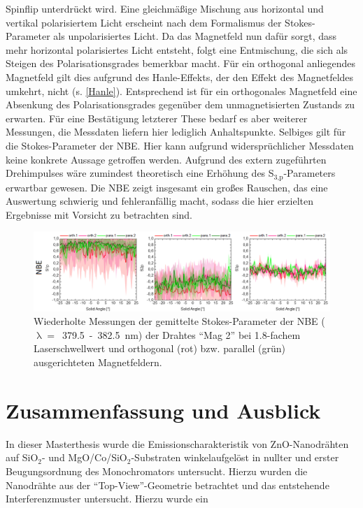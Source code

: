 Spinflip unterdrückt wird. Eine gleichmäßige Mischung aus horizontal und
vertikal polarisiertem Licht erscheint nach dem Formalismus der Stokes-Parameter
als unpolarisiertes Licht. Da das Magnetfeld nun dafür sorgt, dass mehr
horizontal polarisiertes Licht entsteht, folgt eine Entmischung, die sich als
Steigen des Polarisationsgrades bemerkbar macht. Für ein orthogonal anliegendes
Magnetfeld gilt dies aufgrund des Hanle-Effekts, der den Effekt des Magnetfeldes
umkehrt, nicht (s. \autoref{Hanle}). Entsprechend ist für ein orthogonales
Magnetfeld eine Absenkung des Polarisationsgrades gegenüber dem unmagnetisierten
Zustands zu erwarten. Für eine Bestätigung letzterer These bedarf es aber
weiterer Messungen, die Messdaten liefern hier lediglich Anhaltspunkte. Selbiges
gilt für die Stokes-Parameter der NBE. Hier kann aufgrund widersprüchlicher
Messdaten keine konkrete Aussage getroffen werden. Aufgrund des extern
zugeführten Drehimpulses wäre zumindest theoretisch eine Erhöhung des
S$_\text{3,p}$-Parameters erwartbar gewesen. Die NBE zeigt insgesamt ein großes
Rauschen, das eine Auswertung schwierig und fehleranfällig macht, sodass die
hier erzielten Ergebnisse mit Vorsicht zu betrachten sind. \begin{figure}[h]
\centering \includegraphics[width=1\textwidth]{Bilder/Mag/Stokes_NBE_repeat}
\caption{Wiederholte Messungen der gemittelte Stokes-Parameter der NBE
(\mbox{$\uplambda=$ 379.5 - 382.5 nm}) der Drahtes ``Mag 2'' bei 1.8-fachem
Laserschwellwert und orthogonal (rot) bzw. parallel (grün) ausgerichteten
Magnetfeldern.} \label{Stokes_NBE_repeat} \end{figure} \chapter{Zusammenfassung
und Ausblick} In dieser Masterthesis wurde die Emissionscharakteristik von
ZnO-Nanodrähten auf SiO$_\text{2}$- und MgO/Co/SiO$_\text{2}$-Substraten
winkelaufgelöst in nullter und erster Beugungsordnung des Monochromators
untersucht. Hierzu wurden die Nanodrähte aus der ``Top-View''-Geometrie
betrachtet und das entstehende Interferenzmuster untersucht. Hierzu wurde ein
